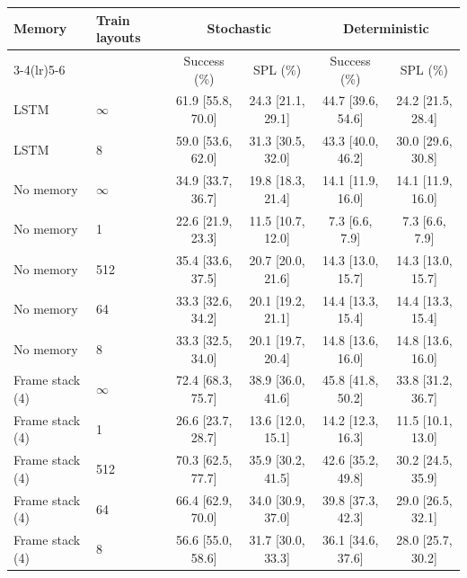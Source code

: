 \begin{tabular}{llcccc}
\toprule
Memory & Train layouts & \multicolumn{2}{c}{Stochastic} & \multicolumn{2}{c}{Deterministic} \\
\cmidrule(lr){3-4}\cmidrule(lr){5-6}
 &  & Success (\%) & SPL (\%) & Success (\%) & SPL (\%) \\
\midrule
LSTM & $\infty$ & 61.9 {\scriptsize[55.8, 70.0]} & 24.3 {\scriptsize[21.1, 29.1]} & 44.7 {\scriptsize[39.6, 54.6]} & 24.2 {\scriptsize[21.5, 28.4]} \\
LSTM & 8 & 59.0 {\scriptsize[53.6, 62.0]} & 31.3 {\scriptsize[30.5, 32.0]} & 43.3 {\scriptsize[40.0, 46.2]} & 30.0 {\scriptsize[29.6, 30.8]} \\
No memory & $\infty$ & 34.9 {\scriptsize[33.7, 36.7]} & 19.8 {\scriptsize[18.3, 21.4]} & 14.1 {\scriptsize[11.9, 16.0]} & 14.1 {\scriptsize[11.9, 16.0]} \\
No memory & 1 & 22.6 {\scriptsize[21.9, 23.3]} & 11.5 {\scriptsize[10.7, 12.0]} & 7.3 {\scriptsize[6.6, 7.9]} & 7.3 {\scriptsize[6.6, 7.9]} \\
No memory & 512 & 35.4 {\scriptsize[33.6, 37.5]} & 20.7 {\scriptsize[20.0, 21.6]} & 14.3 {\scriptsize[13.0, 15.7]} & 14.3 {\scriptsize[13.0, 15.7]} \\
No memory & 64 & 33.3 {\scriptsize[32.6, 34.2]} & 20.1 {\scriptsize[19.2, 21.1]} & 14.4 {\scriptsize[13.3, 15.4]} & 14.4 {\scriptsize[13.3, 15.4]} \\
No memory & 8 & 33.3 {\scriptsize[32.5, 34.0]} & 20.1 {\scriptsize[19.7, 20.4]} & 14.8 {\scriptsize[13.6, 16.0]} & 14.8 {\scriptsize[13.6, 16.0]} \\
Frame stack (4) & $\infty$ & 72.4 {\scriptsize[68.3, 75.7]} & 38.9 {\scriptsize[36.0, 41.6]} & 45.8 {\scriptsize[41.8, 50.2]} & 33.8 {\scriptsize[31.2, 36.7]} \\
Frame stack (4) & 1 & 26.6 {\scriptsize[23.7, 28.7]} & 13.6 {\scriptsize[12.0, 15.1]} & 14.2 {\scriptsize[12.3, 16.3]} & 11.5 {\scriptsize[10.1, 13.0]} \\
Frame stack (4) & 512 & 70.3 {\scriptsize[62.5, 77.7]} & 35.9 {\scriptsize[30.2, 41.5]} & 42.6 {\scriptsize[35.2, 49.8]} & 30.2 {\scriptsize[24.5, 35.9]} \\
Frame stack (4) & 64 & 66.4 {\scriptsize[62.9, 70.0]} & 34.0 {\scriptsize[30.9, 37.0]} & 39.8 {\scriptsize[37.3, 42.3]} & 29.0 {\scriptsize[26.5, 32.1]} \\
Frame stack (4) & 8 & 56.6 {\scriptsize[55.0, 58.6]} & 31.7 {\scriptsize[30.0, 33.3]} & 36.1 {\scriptsize[34.6, 37.6]} & 28.0 {\scriptsize[25.7, 30.2]} \\
\bottomrule
\end{tabular}
